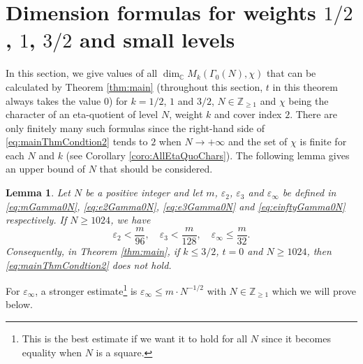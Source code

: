\documentclass[12pt]{amsart}
\numberwithin{equation}{section}
\theoremstyle{plain}
\newtheorem{lemm}[thm]{Lemma}
\theoremstyle{definition}
\theoremstyle{remark}
\newcommand\numC{\mathbb{C}}
\newcommand\numgeq[2]{\mathbb{#1}_{\geq #2}}
\begin{document}
\section{Dimension formulas for weights $1/2$, $1$, $3/2$ and small levels}
\label{sec:Dimension formulas for weight 1/2, 1, 3/2 and small levels}
In this section, we give values of all $\dim_\numC M_{k}(\Gamma_0(N),\chi)$ that can be calculated by Theorem \ref{thm:main} (throughout this section, $t$ in this theorem always takes the value $0$) for $k=1/2$, $1$ and $3/2$, $N\in\numgeq{Z}{1}$ and $\chi$ being the character of an eta-quotient of level $N$, weight $k$ and cover index $2$. There are only finitely many such formulas since the right-hand side of \eqref{eq:mainThmCondtion2} tends to $2$ when $N\to+\infty$ and the set of $\chi$ is finite for each $N$ and $k$ (see Corollary \ref{coro:AllEtaQuoChars}). The following lemma gives an upper bound of $N$ that should be considered.
\begin{lemm}
\label{lemm:NupperBound}
Let $N$ be a positive integer and let $m$, $\varepsilon_2$, $\varepsilon_3$ and $\varepsilon_\infty$ be defined in \eqref{eq:mGamma0N}, \eqref{eq:e2Gamma0N}, \eqref{eq:e3Gamma0N} and \eqref{eq:einftyGamma0N} respectively. If $N\geq1024$, we have
\begin{equation*}
\varepsilon_2<\frac{m}{96},\quad\varepsilon_3<\frac{m}{128},\quad\varepsilon_\infty\leq\frac{m}{32}.
\end{equation*}
Consequently, in Theorem \ref{thm:main}, if $k\leq3/2$, $t=0$ and $N\geq1024$, then \eqref{eq:mainThmCondtion2} does not hold.
\end{lemm}
For $\varepsilon_\infty$, a stronger estimate\footnote{This is the best estimate if we want it to hold for all $N$ since it becomes equality when $N$ is a square.} is $\varepsilon_\infty\leq m\cdot N^{-1/2}$ with $N\in\numgeq{Z}{1}$ which we will prove below.
\end{document}
